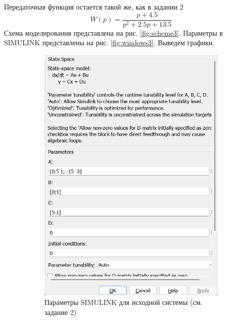 \documentclass[a4paper, 12pt]{article}
\begin{document}
    Передаточная функция остается такой же, как в задании 2
    $$W(p)=\dfrac{p+4.5}{p^2+2.5p+13.5}$$
    Схема моделирования представлена на рис. \ref{fig:scheme3}. Параметры в SIMULINK представлены на рис. \ref{fig:windows3}. Выведем графики.
    \begin{figure}[H]
        \centering
        \begin{subfigure}{0.3\textwidth}
            \centering
            \includegraphics[width=\linewidth]{model_3_window.png}
            \caption{Параметры SIMULINK для исходной системы (см. задание 2)}
            \label{fig:m3w}
        \end{subfigure}
        \begin{subfigure}{0.3\textwidth}
            \centering

\end{subfigure}
\end{figure}
\end{document}
